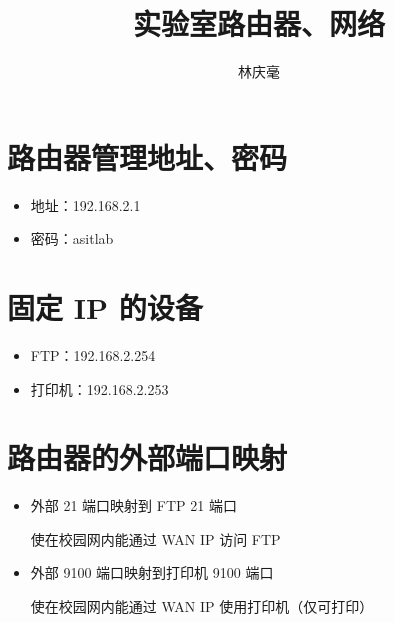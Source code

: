 \documentclass{article}
\begin{document}
\author{林庆毫}
\title{实验室路由器、网络}
\maketitle
\tableofcontents
\newpage
{}

\section{路由器管理地址、密码}
\begin{itemize}
    \item 地址：192.168.2.1
    \item 密码：asitlab
\end{itemize}

\section{固定 IP 的设备}
\begin{itemize}
    \item FTP：192.168.2.254
    \item 打印机：192.168.2.253
\end{itemize}

\section{路由器的外部端口映射}
\begin{itemize}
    \item 外部 21 端口映射到 FTP 21 端口
          
          使在校园网内能通过 WAN IP 访问 FTP
          
    \item 外部 9100 端口映射到打印机 9100 端口
          
          使在校园网内能通过 WAN IP 使用打印机（仅可打印）
\end{itemize}
\end{document}

